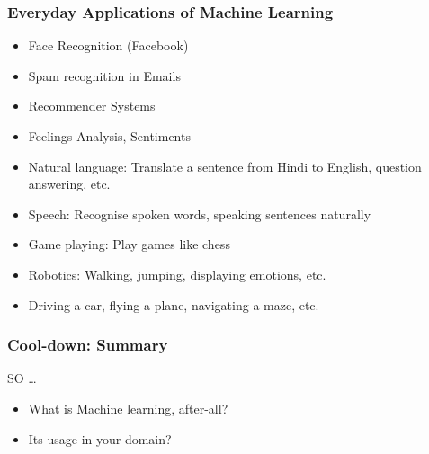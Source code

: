 \begin{frame}[fragile]\frametitle{Everyday Applications of Machine Learning}
\begin{itemize}
\item Face Recognition (Facebook)
\item Spam recognition in Emails
\item Recommender Systems
\item Feelings Analysis, Sentiments
\item Natural language: Translate a sentence from Hindi to English, 
question answering, etc. 
\item Speech: Recognise spoken words, speaking sentences naturally 
\item Game playing: Play games like chess 
\item Robotics: Walking, jumping, displaying emotions, etc. 
\item Driving a car, flying a plane, navigating a maze, etc.
\end{itemize}
\end{frame}

\begin{frame}[fragile]\frametitle{Cool-down: Summary}
SO \ldots
\begin{itemize}
\item What is Machine learning, after-all?
\item Its usage in your domain?
\end{itemize}
\end{frame}



